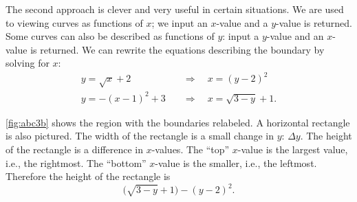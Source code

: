 \begin{example}
The second approach is clever and very useful in certain situations. We are used to viewing curves as functions of $x$; we input an $x$-value and a $y$-value is returned. Some curves can also be described as functions of $y$: input a $y$-value and an $x$-value is returned. We can rewrite the equations describing the boundary by solving for $x$:\vspace{-.3\baselineskip}
\begin{align*}
y=\sqrt{x}+2 & \quad\Rightarrow\quad x=(y-2)^2 \\
y=-(x-1)^2+3 & \quad\Rightarrow\quad x=\sqrt{3-y}+1.
\end{align*}

\autoref{fig:abc3b} shows the region with the boundaries relabeled. A
horizontal rectangle is also pictured. The width of the rectangle is a small change in $y$: $\Delta y$. The height of the rectangle is a difference in $x$-values. The ``top'' $x$-value is the largest value, i.e., the rightmost. The ``bottom'' $x$-value is the smaller, i.e., the leftmost. Therefore the height of the rectangle is
%
%
\[\bigl(\sqrt{3-y}+1\bigr) - (y-2)^2.\]


\end{example}

